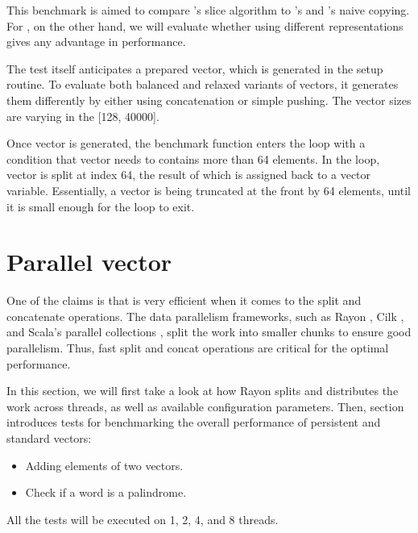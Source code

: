 
This benchmark is aimed to compare \rrbvec{}'s slice algorithm to \stdvec{}'s and \rbvec{}'s naive copying. For \pvec{}, on the other hand, we will evaluate whether using different representations gives any advantage in performance. 


The test itself anticipates a prepared vector, which is generated in the setup routine. To evaluate both balanced and relaxed variants of vectors, it generates them differently by either using concatenation or simple pushing. The vector sizes are varying in the [128, 40000]. 

Once vector is generated, the benchmark function enters the loop with a condition that vector needs to contains more than 64 elements. In the loop, vector is split at index 64, the result of which is assigned back to a vector variable. Essentially, a vector is being truncated at the front by 64 elements, until it is small enough for the loop to exit. 

\section{Parallel vector}
One of the claims is that \rrbvec{} is very efficient when it comes to the split and concatenate operations. The data parallelism frameworks, such as Rayon , Cilk , and Scala's parallel collections , split the work into smaller chunks to ensure good parallelism. Thus, fast split and concat operations are critical for the optimal performance. 

In this section, we will first take a look at how Rayon splits and distributes the work across threads, as well as available configuration parameters. Then, section \todo{} introduces tests for benchmarking the overall performance of persistent and standard vectors:

\begin{itemize}    
    \item Adding elements of two vectors.    
    \item Check if a word is a palindrome.         
\end{itemize}

All the tests will be executed on 1, 2, 4, and 8 threads. 

